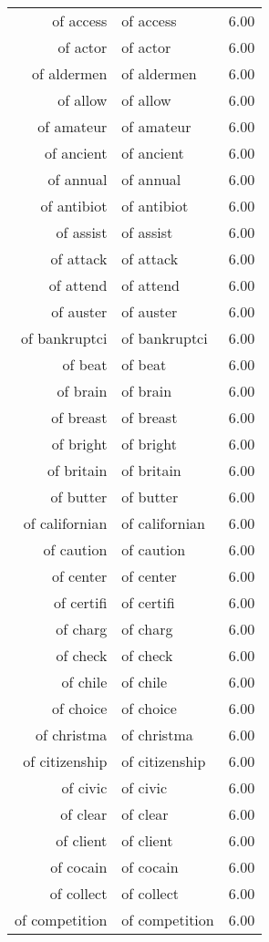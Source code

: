 \begin{table}[ht]
\begin{tabular}{rlr}
  of access & of access & 6.00 \\ 
  of actor & of actor & 6.00 \\ 
  of aldermen & of aldermen & 6.00 \\ 
  of allow & of allow & 6.00 \\ 
  of amateur & of amateur & 6.00 \\ 
  of ancient & of ancient & 6.00 \\ 
  of annual & of annual & 6.00 \\ 
  of antibiot & of antibiot & 6.00 \\ 
  of assist & of assist & 6.00 \\ 
  of attack & of attack & 6.00 \\ 
  of attend & of attend & 6.00 \\ 
  of auster & of auster & 6.00 \\ 
  of bankruptci & of bankruptci & 6.00 \\ 
  of beat & of beat & 6.00 \\ 
  of brain & of brain & 6.00 \\ 
  of breast & of breast & 6.00 \\ 
  of bright & of bright & 6.00 \\ 
  of britain & of britain & 6.00 \\ 
  of butter & of butter & 6.00 \\ 
  of californian & of californian & 6.00 \\ 
  of caution & of caution & 6.00 \\ 
  of center & of center & 6.00 \\ 
  of certifi & of certifi & 6.00 \\ 
  of charg & of charg & 6.00 \\ 
  of check & of check & 6.00 \\ 
  of chile & of chile & 6.00 \\ 
  of choice & of choice & 6.00 \\ 
  of christma & of christma & 6.00 \\ 
  of citizenship & of citizenship & 6.00 \\ 
  of civic & of civic & 6.00 \\ 
  of clear & of clear & 6.00 \\ 
  of client & of client & 6.00 \\ 
  of cocain & of cocain & 6.00 \\ 
  of collect & of collect & 6.00 \\ 
  of competition & of competition & 6.00 \\ 

\end{tabular}
\end{table}

